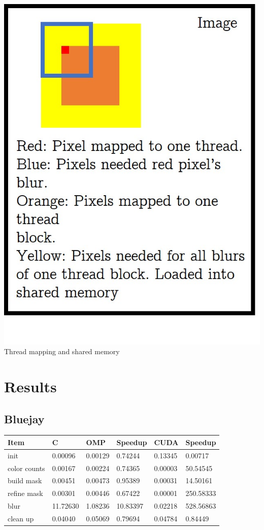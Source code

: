 \documentclass[12pt]{article}
\begin{document}
\begin{center}
\includegraphics[scale=0.3]{mapping.jpg} \\
Thread mapping and shared memory
\end{center}

\section{Results}

\subsection{Bluejay}
\begin{tabular}{l|l|l|l|l|l}
    Item & C & OMP & Speedup & CUDA & Speedup
\\  \hline
    init & 0.00096 & 0.00129 & 0.74244 & 0.13345 & 0.00717
\\  color counts & 0.00167 & 0.00224 & 0.74365 & 0.00003 & 50.54545
\\  build mask & 0.00451 & 0.00473 & 0.95389 & 0.00031 & 14.50161
\\  refine mask & 0.00301 & 0.00446 & 0.67422 & 0.00001 & 250.58333
\\  blur & 11.72630 & 1.08236 & 10.83397 & 0.02218 & 528.56863
\\  clean up & 0.04040 & 0.05069 & 0.79694 & 0.04784 & 0.84449
\end{tabular}
\end{document}

